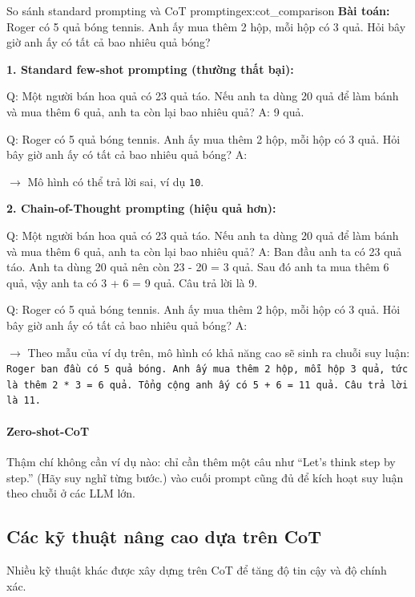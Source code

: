 \begin{example}{So sánh standard prompting và CoT prompting}{ex:cot_comparison}
    \textbf{Bài toán:} Roger có 5 quả bóng tennis. Anh ấy mua thêm 2 hộp, mỗi hộp có 3 quả. Hỏi bây giờ anh ấy có tất cả bao nhiêu quả bóng?
    
    \textbf{1. Standard few-shot prompting (thường thất bại):}
    \begin{promptbox}
    Q: Một người bán hoa quả có 23 quả táo. Nếu anh ta dùng 20 quả để làm bánh và mua thêm 6 quả, anh ta còn lại bao nhiêu quả?
    A: 9 quả.

    Q: Roger có 5 quả bóng tennis. Anh ấy mua thêm 2 hộp, mỗi hộp có 3 quả. Hỏi bây giờ anh ấy có tất cả bao nhiêu quả bóng?
    A:
    \end{promptbox}
    \(\rightarrow\) Mô hình có thể trả lời sai, ví dụ \texttt{10}.

    \textbf{2. Chain-of-Thought prompting (hiệu quả hơn):}
    \begin{promptbox}
    Q: Một người bán hoa quả có 23 quả táo. Nếu anh ta dùng 20 quả để làm bánh và mua thêm 6 quả, anh ta còn lại bao nhiêu quả?
    A: Ban đầu anh ta có 23 quả táo. Anh ta dùng 20 quả nên còn 23 - 20 = 3 quả. Sau đó anh ta mua thêm 6 quả, vậy anh ta có 3 + 6 = 9 quả. Câu trả lời là 9.

    Q: Roger có 5 quả bóng tennis. Anh ấy mua thêm 2 hộp, mỗi hộp có 3 quả. Hỏi bây giờ anh ấy có tất cả bao nhiêu quả bóng?
    A:
    \end{promptbox}
    \(\rightarrow\) Theo mẫu của ví dụ trên, mô hình có khả năng cao sẽ sinh ra chuỗi suy luận: \texttt{Roger ban đầu có 5 quả bóng. Anh ấy mua thêm 2 hộp, mỗi hộp 3 quả, tức là thêm 2 * 3 = 6 quả. Tổng cộng anh ấy có 5 + 6 = 11 quả. Câu trả lời là 11.}
\end{example}

\paragraph{Zero-shot-CoT}
Thậm chí không cần ví dụ nào: chỉ cần thêm một câu như “Let's think step by step.” (Hãy suy nghĩ từng bước.) vào cuối prompt cũng đủ để kích hoạt suy luận theo chuỗi ở các LLM lớn.

\subsection{Các kỹ thuật nâng cao dựa trên CoT}
\label{ssec:advanced_cot}
Nhiều kỹ thuật khác được xây dựng trên CoT để tăng độ tin cậy và độ chính xác.

